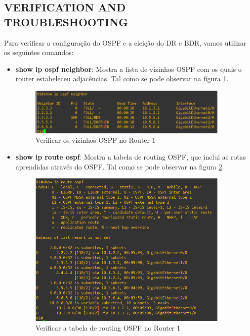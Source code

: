 \documentclass[11pt,english, openright, oneside]{book}
\begin{document}
\subsection{VERIFICATION AND TROUBLESHOOTING}
\vspace{0.2cm}

Para verificar a configuração do OSPF e a eleição do DR e BDR, vamos utilizar os seguintes comandos:
\vspace{0.2cm}

\begin{itemize}
  \item \textbf{show ip ospf neighbor}: Mostra a lista de vizinhos OSPF com os quais o router estabeleceu adjacências. Tal como se pode observar na figura \ref{fig:config10}.
  \vspace{0.2cm}

  \begin{figure}[H]
    \centering
    \includegraphics[width=0.92\textwidth]{imagens/Tarefa2/9.ospf_neigh.png}
    \caption{Verificar os vizinhos OSPF no Router 1}
    \label{fig:config10}
  \end{figure}
  \vspace{0.2cm}

  \item \textbf{show ip route ospf}: Mostra a tabela de routing OSPF, que inclui as rotas aprendidas através do OSPF. Tal como se pode observar na figura \ref{fig:config11}.
  \vspace{0.2cm}

  \begin{figure}[H]
    \centering
    \includegraphics[width=0.92\textwidth]{imagens/Tarefa2/9.ospf_route.png}
    \caption{Verificar a tabela de routing OSPF no Router 1}
    \label{fig:config11}
  \end{figure}
  \vspace{0.2cm}


\end{itemize}
\end{document}
